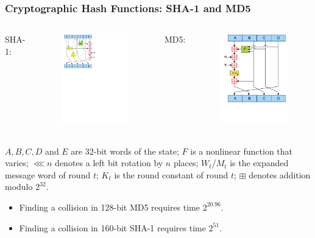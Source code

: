 \begin{frame}\frametitle{Cryptographic Hash Functions: SHA-1 and MD5}
\begin{columns}[C]
SHA-1:
\begin{figure}
\begin{center}
\includegraphics[width=40mm]{pic/SHA1}
\end{center}
\end{figure}
MD5:
\begin{figure}
\begin{center}
\includegraphics[width=40mm]{pic/MD5}
\end{center}
\end{figure}
\end{columns}
$A, B, C, D$ and $E$ are 32-bit words of the state;
$F$ is a nonlinear function that varies;
$\lll n$ denotes a left bit rotation by $n$ places;
$W_t$/$M_t$ is the expanded message word of round $t$;
$K_t$ is the round constant of round $t$;
$\boxplus$ denotes addition modulo $2^{32}$.
\begin{itemize}
\item Finding a collision in 128-bit MD5 requires time $2^{20.96}$. 
\item Finding a collision in 160-bit SHA-1 requires time $2^{51}$.
\end{itemize}
\end{frame}
